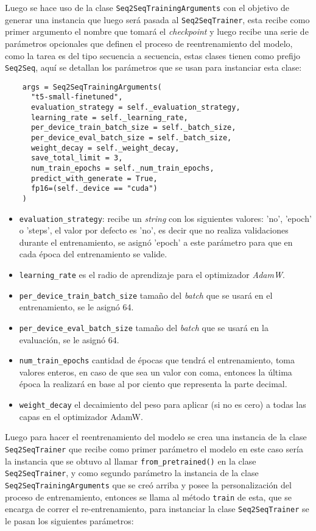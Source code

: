 Luego se hace uso de la clase \texttt{Seq2SeqTrainingArguments}  con el objetivo de generar una instancia que luego será pasada al \texttt{Seq2SeqTrainer}, esta recibe como primer argumento el nombre que tomará el \textit{checkpoint} y luego recibe una serie de parámetros opcionales que definen el proceso de reentrenamiento del modelo, como la tarea es del tipo secuencia a secuencia, estas clases tienen como prefijo \texttt{Seq2Seq}, aquí se detallan los parámetros que se usan para instanciar esta clase:

\begin{verbatim}
    args = Seq2SeqTrainingArguments(
      "t5-small-finetuned",
      evaluation_strategy = self._evaluation_strategy,
      learning_rate = self._learning_rate,
      per_device_train_batch_size = self._batch_size,
      per_device_eval_batch_size = self._batch_size,
      weight_decay = self._weight_decay,
      save_total_limit = 3,
      num_train_epochs = self._num_train_epochs,
      predict_with_generate = True,
      fp16=(self._device == "cuda")
    )
\end{verbatim}

\begin{itemize}
    \item \texttt{evaluation\_strategy}: recibe un \textit{string} con los siguientes valores: 'no', 'epoch' o 'steps', el valor por defecto es 'no', es decir que no realiza validaciones durante el entrenamiento, se asignó 'epoch' a este parámetro para que en cada época del entrenamiento se valide.
    \item \texttt{learning\_rate} es el radio de aprendizaje para el optimizador \textit{AdamW}.
    \item \texttt{per\_device\_train\_batch\_size} tamaño del \textit{batch} que se usará en el entrenamiento, se le asignó 64.
    \item \texttt{per\_device\_eval\_batch\_size} tamaño del \textit{batch} que se usará en la evaluación, se le asignó 64.
    \item \texttt{num\_train\_epochs} cantidad de épocas que tendrá el entrenamiento, toma valores enteros, en caso de que sea un valor con coma, entonces la última época la realizará en base al por ciento que representa la parte decimal.
    \item \texttt{weight\_decay} el decaimiento del peso para aplicar (si no es cero) a todas las capas en el optimizador AdamW.
\end{itemize}

Luego para hacer el reentrenamiento del modelo se crea una instancia de la clase \texttt{Seq2SeqTrainer} que recibe como primer parámetro el modelo en este caso sería la instancia que se obtuvo al llamar \texttt{from\_pretrained()} en la clase \texttt{Seq2SeqTrainer}, y como segundo parámetro la instancia de la clase \texttt{Seq2SeqTrainingArguments} que se creó arriba y posee la personalización del proceso de entrenamiento, entonces se llama al método \texttt{train} de esta, que se encarga de correr el re-entrenamiento, para instanciar la clase \texttt{Seq2SeqTrainer} se le pasan los siguientes parámetros:

